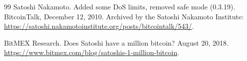 \documentclass[11pt]{article}
\theoremstyle{definition}
\theoremstyle{plain}
\begin{document}
\begin{thebibliography}{99}
Satoshi Nakamoto.
\newblock Added some DoS limits, removed safe mode (0.3.19).
\newblock BitcoinTalk, December 12, 2010.
\newblock Archived by the Satoshi Nakamoto Institute:
\url{https://satoshi.nakamotoinstitute.org/posts/bitcointalk/543/}.

BitMEX Research.
\newblock Does Satoshi have a million bitcoin?
\newblock August 20, 2018.
\newblock \url{https://www.bitmex.com/blog/satoshis-1-million-bitcoin}.

\end{thebibliography}
\end{document}

